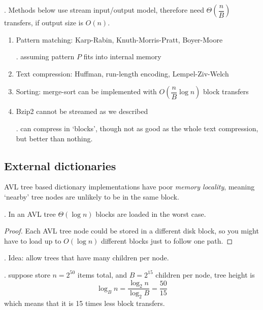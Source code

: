 \documentclass{article}
\begin{document}
\begin{result}[].
    Methods below use stream input/output model, therefore need $\Theta \left( \dfrac{n}{B} \right)$ transfers, if output size is $O(n)$. 
    \begin{enumerate}
        \item Pattern matching: Karp-Rabin, Knuth-Morris-Pratt, Boyer-Moore
        \begin{comm}[].
            assuming pattern $P$ fits into internal memory 
        \end{comm}
        \item Text compression: Huffman, run-length encoding, Lempel-Ziv-Welch
        \item Sorting: merge-sort can be implemented with $O \left( \dfrac{n}{B} \log n \right)$ block transfers 
        \item Bzip2 cannot be streamed as we described
        \begin{comm}[].
            can compress in `blocks', though not as good as the whole text compression, but better than nothing. 
        \end{comm}
    \end{enumerate}
\end{result}

\subsection{External dictionaries}

AVL tree based dictionary implementations have poor \textit{memory locality}, meaning `nearby' tree nodes are unlikely to be in the same block.

\begin{discovery}[].
    In an AVL tree $\Theta(\log n)$ blocks are loaded in the worst case. 
\end{discovery}

\begin{proof}
    Each AVL tree node could be stored in a different disk block, so you might have to load up to $O(\log n)$ different blocks just to follow one path.
\end{proof}

\begin{thmm}[].
    Idea: allow trees that have many children per node. 
\end{thmm}

\begin{examplee}[].
    suppose store $n = 2^{50}$ items total, and $B = 2^{15}$ children per node, tree height is 
    \[ \log_B n = \frac{\log_2 n}{\log_2 B} = \frac{50}{15} \]
    which means that it is 15 times less block transfers. 
\end{examplee}
\end{document}
